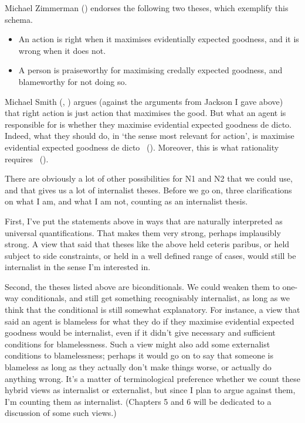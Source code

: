 \documentclass[
  10pt,
  letterpaper,
  twoside]{scrbook}
\providecommand{\tightlist}{%
  \setlength{\itemsep}{0pt}\setlength{\parskip}{0pt}}\usepackage{longtable,booktabs,array}
\begin{document}
Michael Zimmerman () endorses the
following two theses, which exemplify this schema.

\begin{itemize}
\tightlist
\item
  An action is right when it maximises evidentially expected goodness,
  and it is wrong when it does not.
\item
  A person is praiseworthy for maximising credally expected goodness,
  and blameworthy for not doing so.
\end{itemize}

Michael Smith (,
) argues (against the arguments from
Jackson I gave above) that right action is just action that maximises
the good. But what an agent is responsible for is whether they maximise
evidential expected goodness de dicto. Indeed, what they should do, in
`the sense most relevant for action', is maximise evidential expected
goodness de dicto ~().
Moreover, this is what rationality requires
~().

There are obviously a lot of other possibilities for N1 and N2 that we
could use, and that gives us a lot of internalist theses. Before we go
on, three clarifications on what I am, and what I am not, counting as an
internalist thesis.

First, I've put the statements above in ways that are naturally
interpreted as universal quantifications. That makes them very strong,
perhaps implausibly strong. A view that said that theses like the above
held ceteris paribus, or held subject to side constraints, or held in a
well defined range of cases, would still be internalist in the sense I'm
interested in.

Second, the theses listed above are biconditionals. We could weaken them
to one-way conditionals, and still get something recognisably
internalist, as long as we think that the conditional is still somewhat
explanatory. For instance, a view that said an agent is blameless for
what they do if they maximise evidential expected goodness would be
internalist, even if it didn't give necessary and sufficient conditions
for blamelessness. Such a view might also add some externalist
conditions to blamelessness; perhaps it would go on to say that someone
is blameless as long as they actually don't make things worse, or
actually do anything wrong. It's a matter of terminological preference
whether we count these hybrid views as internalist or externalist, but
since I plan to argue against them, I'm counting them as internalist.
(Chapters 5 and 6 will be dedicated to a discussion of some such views.)
\end{document}
